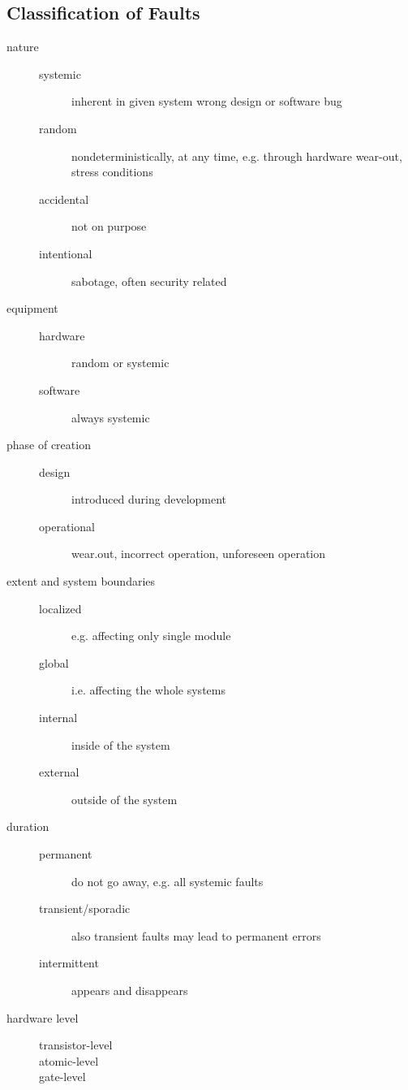 \documentclass[a4paper, 10pt]{article}
\begin{document}
\subsection*{Classification of Faults}
\begin{description}
    \item[nature]
    \begin{description}
        \item[systemic] inherent in given system \follows wrong design or software bug
        \item[random] nondeterministically, at any time, e.g. through hardware wear-out, stress conditions
        \item[accidental] not on purpose
        \item[intentional] sabotage, often security related
    \end{description}
    \item[equipment]
    \begin{description}
        \item[hardware] random or systemic
        \item[software] always systemic
    \end{description}
    \item[phase of creation]
    \begin{description}
        \item[design] introduced during development
        \item[operational] wear.out, incorrect operation, unforeseen operation
    \end{description}
    \item[extent and system boundaries]
    \begin{description}
        \item[localized] e.g. affecting only single module
        \item[global] i.e. affecting the whole systems
        \item[internal] inside of the system
        \item[external] outside of the system
    \end{description}
    \item[duration]
    \begin{description}
        \item[permanent] do not go away, e.g. all systemic faults
        \item[transient/sporadic] also transient faults may lead to permanent errors
        \item[intermittent] appears and disappears
    \end{description}
    \item[hardware level]
    \begin{description}
        \item[transistor-level]
        \item[atomic-level]
        \item[gate-level]
    \end{description}
\end{description}
\end{document}
